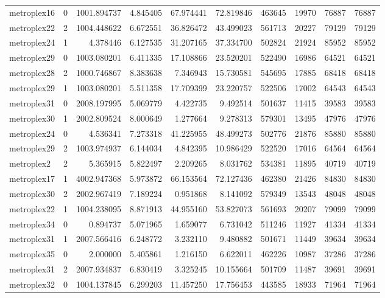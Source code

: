 \begin{longtable}{|l|r|r|r|r|r|r|r|r|r|}
metroplex16 & 0 & 1001.894737 & 4.845405 & 67.974441 & 72.819846 & 463645 & 19970 & 76887 & 76887 \\
metroplex22 & 2 & 1004.448622 & 6.672551 & 36.826472 & 43.499023 & 561713 & 20227 & 79129 & 79129 \\
metroplex24 & 1 & 4.378446 & 6.127535 & 31.207165 & 37.334700 & 502824 & 21924 & 85952 & 85952 \\
metroplex29 & 0 & 1003.080201 & 6.411335 & 17.108866 & 23.520201 & 522490 & 16986 & 64521 & 64521 \\
metroplex28 & 2 & 1000.746867 & 8.383638 & 7.346943 & 15.730581 & 545695 & 17885 & 68418 & 68418 \\
metroplex29 & 1 & 1003.080201 & 5.511358 & 17.709399 & 23.220757 & 522506 & 17002 & 64543 & 64543 \\
metroplex31 & 0 & 2008.197995 & 5.069779 & 4.422735 & 9.492514 & 501637 & 11415 & 39583 & 39583 \\
metroplex30 & 1 & 2002.809524 & 8.000649 & 1.277664 & 9.278313 & 579301 & 13495 & 47976 & 47976 \\
metroplex24 & 0 & 4.536341 & 7.273318 & 41.225955 & 48.499273 & 502776 & 21876 & 85880 & 85880 \\
metroplex29 & 2 & 1003.974937 & 6.144034 & 4.842395 & 10.986429 & 522520 & 17016 & 64564 & 64564 \\
metroplex2 & 2 & 5.365915 & 5.822497 & 2.209265 & 8.031762 & 534381 & 11895 & 40719 & 40719 \\
metroplex17 & 1 & 4002.947368 & 5.973872 & 66.153564 & 72.127436 & 462380 & 21426 & 84830 & 84830 \\
metroplex30 & 2 & 2002.967419 & 7.189224 & 0.951868 & 8.141092 & 579349 & 13543 & 48048 & 48048 \\
metroplex22 & 1 & 1004.238095 & 8.871913 & 44.955160 & 53.827073 & 561693 & 20207 & 79099 & 79099 \\
metroplex34 & 0 & 0.894737 & 5.071965 & 1.659077 & 6.731042 & 511246 & 11927 & 41334 & 41334 \\
metroplex31 & 1 & 2007.566416 & 6.248772 & 3.232110 & 9.480882 & 501671 & 11449 & 39634 & 39634 \\
metroplex35 & 0 & 2.000000 & 5.405861 & 1.216150 & 6.622011 & 462226 & 10987 & 37286 & 37286 \\
metroplex31 & 2 & 2007.934837 & 6.830419 & 3.325245 & 10.155664 & 501709 & 11487 & 39691 & 39691 \\
metroplex32 & 0 & 1004.137845 & 6.299203 & 11.457250 & 17.756453 & 443585 & 18933 & 71964 & 71964 \\

\end{longtable}
